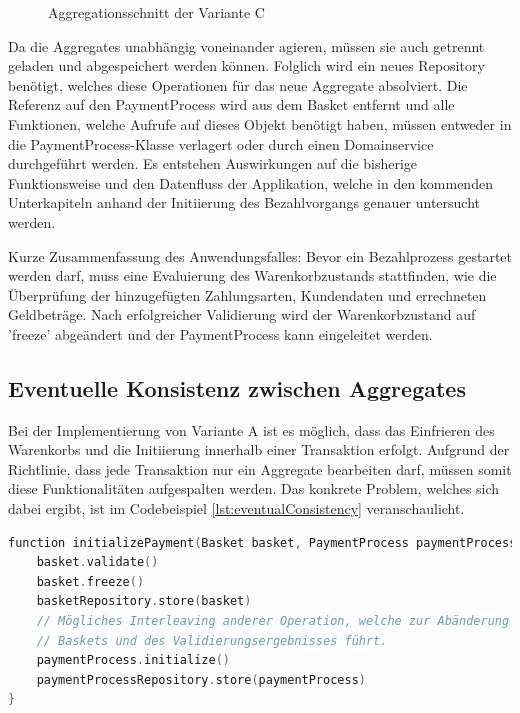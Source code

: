 \begin{figure}[htbp]
	\centering
	
	\caption{Aggregationsschnitt der Variante C}
	\label{fig:VarC}
\end{figure}

Da die Aggregates unabhängig voneinander agieren, müssen sie auch getrennt geladen und abgespeichert werden können. Folglich wird ein neues Repository benötigt, welches diese Operationen für das neue Aggregate absolviert. Die Referenz auf den PaymentProcess wird aus dem Basket entfernt und alle Funktionen, welche Aufrufe auf dieses Objekt benötigt haben, müssen entweder in die PaymentProcess-Klasse verlagert oder durch einen Domainservice durchgeführt werden. Es entstehen Auswirkungen auf die bisherige Funktionsweise und den Datenfluss der Applikation, welche in den kommenden Unterkapiteln anhand der Initiierung des Bezahlvorgangs genauer untersucht werden.

Kurze Zusammenfassung des Anwendungsfalles: 
Bevor ein Bezahlprozess gestartet werden darf, muss eine Evaluierung des Warenkorbzustands stattfinden, wie die Überprüfung der hinzugefügten Zahlungsarten, Kundendaten und errechneten Geldbeträge. Nach erfolgreicher Validierung wird der Warenkorbzustand auf 'freeze' abgeändert und der PaymentProcess kann eingeleitet werden.

\subsection{Eventuelle Konsistenz zwischen Aggregates}

Bei der Implementierung von Variante A ist es möglich, dass das Einfrieren des Warenkorbs und die Initiierung innerhalb einer Transaktion erfolgt. Aufgrund der Richtlinie, dass jede Transaktion nur ein Aggregate bearbeiten darf, müssen somit diese Funktionalitäten aufgespalten werden. Das konkrete Problem, welches sich dabei ergibt, ist im Codebeispiel \ref{lst:eventualConsistency} veranschaulicht.

\begin{minipage}{\linewidth} %
	\begin{lstlisting}[caption={Getrennte Transaktionen für die Initiierung des Bezahlvorgangs}, label={lst:eventualConsistency}, language=Kotlin]
function initializePayment(Basket basket, PaymentProcess paymentProcess) {
	basket.validate()
	basket.freeze()
	basketRepository.store(basket)
	// Mögliches Interleaving anderer Operation, welche zur Abänderung des
	// Baskets und des Validierungsergebnisses führt.
	paymentProcess.initialize()
	paymentProcessRepository.store(paymentProcess)
}
	\end{lstlisting}
\end{minipage}

